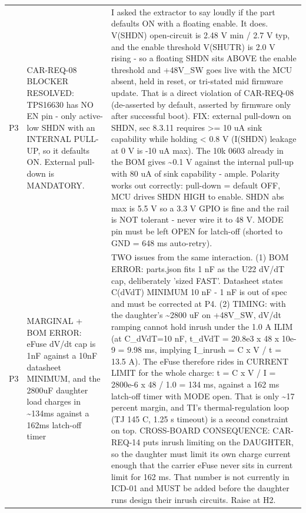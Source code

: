 \documentclass[11pt,a4paper]{article}
\begin{document}
{\begin{longtable}{lp{5.2cm}p{7.2cm}}
P3 & CAR-REQ-08 BLOCKER RESOLVED: TPS16630 has NO EN pin - only active-low SHDN with an INTERNAL PULL-UP, so it defaults ON. External pull-down is MANDATORY. & I asked the extractor to say loudly if the part defaults ON with a floating enable. It does. V(SHDN) open-circuit is 2.48 V min / 2.7 V typ, and the enable threshold V(SHUTR) is 2.0 V rising - so a floating SHDN sits ABOVE the enable threshold and +48V\_SW goes live with the MCU absent, held in reset, or tri-stated mid firmware update. That is a direct violation of CAR-REQ-08 (de-asserted by default, asserted by firmware only after successful boot). FIX: external pull-down on SHDN, sec 8.3.11 requires \textgreater{}= 10 uA sink capability while holding \textless{} 0.8 V (I(SHDN) leakage at 0 V is -10 uA max). The 10k 0603 already in the BOM gives \textasciitilde{}0.1 V against the internal pull-up with 80 uA of sink capability - ample. Polarity works out correctly: pull-down = default OFF, MCU drives SHDN HIGH to enable. SHDN abs max is 5.5 V so a 3.3 V GPIO is fine and the rail is NOT tolerant - never wire it to 48 V. MODE pin must be left OPEN for latch-off (shorted to GND = 648 ms auto-retry). \\
P3 & MARGINAL + BOM ERROR: eFuse dV/dt cap is 1nF against a 10nF datasheet MINIMUM, and the 2800uF daughter load charges in \textasciitilde{}134ms against a 162ms latch-off timer & TWO issues from the same interaction. (1) BOM ERROR: parts.json fits 1 nF as the U22 dV/dT cap, deliberately 'sized FAST'. Datasheet states C(dVdT) MINIMUM 10 nF - 1 nF is out of spec and must be corrected at P4. (2) TIMING: with the daughter's \textasciitilde{}2800 uF on +48V\_SW, dV/dt ramping cannot hold inrush under the 1.0 A ILIM (at C\_dVdT=10 nF, t\_dVdT = 20.8e3 x 48 x 10e-9 = 9.98 ms, implying I\_inrush = C x V / t = 13.5 A). The eFuse therefore rides in CURRENT LIMIT for the whole charge: t = C x V / I = 2800e-6 x 48 / 1.0 = 134 ms, against a 162 ms latch-off timer with MODE open. That is only \textasciitilde{}17 percent margin, and TI's thermal-regulation loop (TJ 145 C, 1.25 s timeout) is a second constraint on top. CROSS-BOARD CONSEQUENCE: CAR-REQ-14 puts inrush limiting on the DAUGHTER, so the daughter must limit its own charge current enough that the carrier eFuse never sits in current limit for 162 ms. That number is not currently in ICD-01 and MUST be added before the daughter runs design their inrush circuits. Raise at H2. \\

\end{longtable}}
\end{document}
